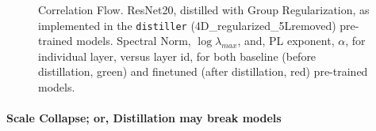 \begin{figure}[t]
   \centering
   \caption{Correlation Flow.
            ResNet20, distilled with Group Regularization, as implemented in the \texttt{distiller} (4D\_regularized\_5Lremoved) pre-trained models.  
            Spectral Norm, $\log\lambda_{max}$, and, PL exponent, $\alpha$, for individual layer, versus layer id, for both baseline (before distillation, green) and finetuned (after distillation, red) pre-trained models. 
           }
   \label{fig:resnet204D5L}
\end{figure}

\paragraph{Scale Collapse; or, Distillation may break models}

